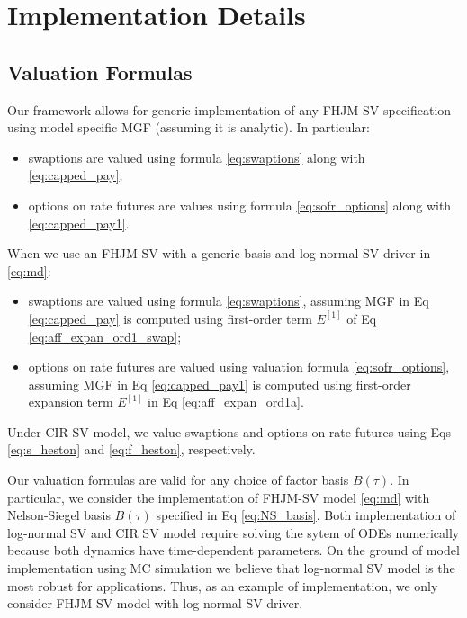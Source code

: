 \documentclass[pdftex,11pt,a4paper] {article}
\begin{document}
 



\section{Implementation Details}\label{sec::implementation_details}


\subsection{Valuation Formulas}

Our framework allows for generic implementation of any FHJM-SV specification using model specific MGF (assuming it is analytic). In particular:
\begin{itemize}
\item  swaptions are valued using formula \eqref{eq:swaptions} along with \eqref{eq:capped_pay};
	
\item options on rate futures are values using formula \eqref{eq:sofr_options} along with \eqref{eq:capped_pay1}.
\end{itemize}

When we use an FHJM-SV with a generic basis and log-normal SV driver in \eqref{eq:md}:
\begin{itemize}

\item swaptions are valued using formula \eqref{eq:swaptions}, assuming MGF in Eq \eqref{eq:capped_pay} is computed using first-order term $E^{[1]}$ of Eq \eqref{eq:aff_expan_ord1_swap}; 

\item options on rate futures are valued using valuation formula \eqref{eq:sofr_options}, assuming MGF in Eq \eqref{eq:capped_pay1} is computed using first-order expansion term $E^{[1]}$ in Eq \eqref{eq:aff_expan_ord1a}. 
\end{itemize}

Under CIR SV model, we value swaptions and options on rate futures using Eqs \eqref{eq:s_heston} and \eqref{eq:f_heston}, respectively. 

Our valuation formulas are valid for any choice of factor basis $B(\tau)$. In particular, we consider the implementation of FHJM-SV model \eqref{eq:md} with Nelson-Siegel basis $B(\tau)$ specified in Eq \eqref{eq:NS_basis}. Both implementation of log-normal SV and CIR SV model require solving the sytem of ODEs numerically because both dynamics have time-dependent parameters. On the ground of model implementation using MC simulation we believe that log-normal SV model is the most robust for applications. Thus, as an  example of implementation, we only consider FHJM-SV model with log-normal SV driver.
\end{document}
